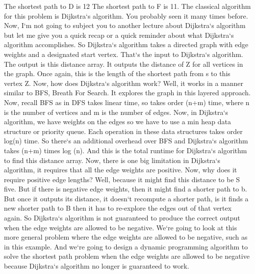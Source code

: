 The shortest path to D is 12 The shortest path to F is 11.
The classical algorithm for this problem is Dijkstra`s algorithm.
You probably seen it many times before.
Now, I`m not going to subject you to another lecture about Dijkstra`s algorithm but let me give you a quick recap or a quick reminder about what Dijkstra`s algorithm accomplishes.
So Dijkstra`s algorithm takes a directed graph with edge weights and a designated start vertex.
That`s the input to Dijkstra`s algorithm.
The output is this distance array.
It outputs the distance of Z for all vertices in the graph.
Once again, this is the length of the shortest path from s to this vertex Z\@.
Now, how does Dijkstra`s algorithm work? Well, it works in a manner similar to BFS, Breath For Search.
It explores the graph in this layered approach.
Now, recall BFS as in DFS takes linear time, so takes order (n+m) time, where n is the number of vertices and m is the number of edges.
Now, in Dijkstra`s algorithm, we have weights on the edges so we have to use a min heap data structure or priority queue.
Each operation in these data structures takes order log(n) time.
So there`s an additional overhead over BFS and Dijkstra`s algorithm takes (n+m) times log (n).
And this is the total runtime for Dijkstra`s algorithm to find this distance array.
Now, there is one big limitation in Dijkstra`s algorithm, it requires that all the edge weights are positive.
Now, why does it require positive edge lengths? Well, because it might find this distance to be S five.
But if there is negative edge weights, then it might find a shorter path to b.
But once it outputs its distance, it doesn`t recompute a shorter path, is it finds a new shorter path to B then it has to re-explore the edges out of that vertex again.
So Dijkstra`s algorithm is not guaranteed to produce the correct output when the edge weights are allowed to be negative.
We`re going to look at this more general problem where the edge weights are allowed to be negative, such as in this example.
And we`re going to design a dynamic programming algorithm to solve the shortest path problem when the edge weights are allowed to be negative because Dijkstra`s algorithm no longer is guaranteed to work.

